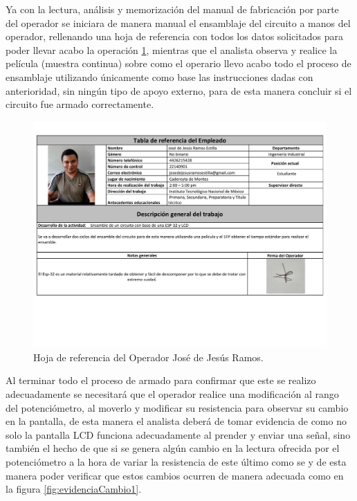     Ya con la lectura, análisis y memorización del manual de fabricación por parte del operador se iniciara de manera manual el ensamblaje del circuito a manos del operador, rellenando una hoja de referencia con todos los datos solicitados para poder llevar acabo la operación \ref{fig:tabla_Operador}, mientras que el analista observa y realice la película (muestra continua) sobre como el operario llevo acabo todo el proceso de ensamblaje utilizando únicamente como base las instrucciones dadas con anterioridad, sin ningún tipo de apoyo externo, para de esta manera concluir si el circuito fue armado correctamente.
\begin{figure}[H]
    \centering
    \includegraphics[trim = {1mm 50mm 1mm 1mm},clip,scale=0.3]{19/Img/tabla_Operador.pdf}
    \caption{Hoja de referencia del Operador José de Jesús Ramos.}
    \label{fig:tabla_Operador}
\end{figure}
    Al terminar todo el proceso de armado para confirmar que este se realizo adecuadamente se necesitará que el operador realice una modificación al rango del potenciómetro, al moverlo y modificar su resistencia para observar su cambio en la pantalla, de esta manera el analista deberá de tomar evidencia de como no solo la pantalla LCD funciona adecuadamente al prender y enviar una señal, sino también el hecho de que si se genera algún cambio en la lectura ofrecida por el potenciómetro a la hora de variar la resistencia de este último como se y de esta manera poder verificar que estos cambios ocurren de manera adecuada como en la figura \ref{fig:evidenciaCambio1}.
